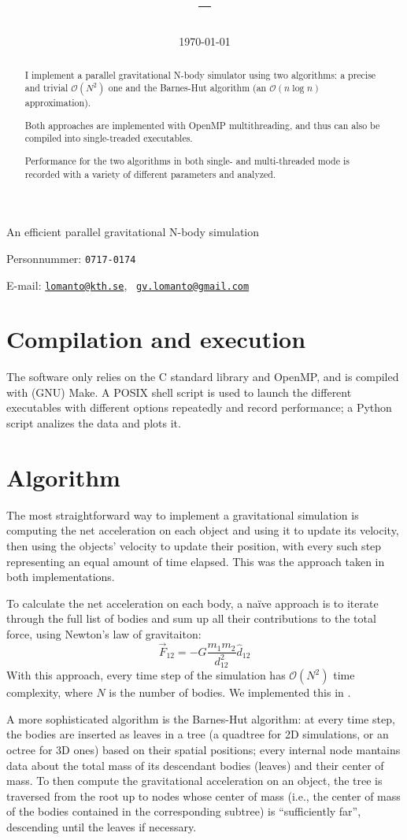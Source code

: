 \documentclass[a4paper, 11pt]{article}
\author{\fullname}
\title{\thiscourse{} \thisreport{} -- \thisprogram{} \thisperiod{}}
\date{\today}
\makeatletter
\newcommand\titlegeometry{\newgeometry{left = 5cm, right = 5cm, top = 5cm, bottom = 5cm}}
\newcommand*\bigo[1]{\(\mathcal{O}\left(#1\right)\)}
\newcommand\bh{Barnes-Hut}
\newcommand\theomp{OpenMP}
\newcommand\posix{POSIX}
\newcommand*\versor[1]{\hat{#1}}
\newcommand*\mailto[1]{\href{mailto:#1}{\nolinkurl{#1}}}
\newcommand*\kthmail{\mailto{lomanto@kth.se}}
\newcommand*\personalmail{\mailto{gv.lomanto@gmail.com}}
\newcommand*\ddob{17}
\newcommand*\mmob{07}
\newcommand*\yyob{1995}
\newcommand*\pnlast{0174}
\newcommand*\personnummer{\expandafter\@gobbletwo\yyob\mmob\ddob-\pnlast}
\newcommand*\isodob{\yyob--\mmob--\ddob}
\newcommand*\thedob{Date of birth: \isodob}
\newcommand*\thepn{Personnummer: \texttt{\personnummer{}}}
\newcommand*\themail{E-mail: \kthmail{}, \ \personalmail{} }
\newcommand*\thesubtitle{An efficient parallel gravitational N-body simulation}
\newcommand*\undefbg{\backgroundsetup{pages=some,contents={}}}
\newenvironment{logotitlepage}
    { %
        \titlegeometry
        \begin{titlepage}
        \thispagestyle{empty}
        \BgThispage
        \begin{spacing}{2}
    }
    { %
        \end{spacing}
        \end{titlepage}
    }
\newcommand*\makemytitle{ %
    \begin{logotitlepage}
        \begin{center}
            \makebox[\textwidth][c]{\huge \thetitle}
			\par
			{\LARGE \thesubtitle}
            \par
            \thedate
        \end{center}

        \vfill

        \textsc{\theauthor} \par
        \thepn \par
        \themail
    \end{logotitlepage}
    \restoregeometry
    \undefbg
}
\makeatother
\begin{document}
\makemytitle

\newpage

\begin{abstract}
	I implement a parallel gravitational N-body simulator using two algorithms:
	a precise and trivial \bigo{N^2} one and the \bh{} algorithm (an \bigo{n \log n} approximation).

	Both approaches are implemented with \theomp{} multithreading, and thus can also be compiled into
	single-treaded executables.

	Performance for the two algorithms in both single- and multi-threaded mode is recorded with a
	variety of different parameters and analyzed.
\end{abstract}

\section{Compilation and execution}

The software only relies on the C standard library and \theomp{}, and is compiled with (GNU) Make.
A \posix{} shell script is used to launch the different executables with different options repeatedly and record performance;
a Python script analizes the data and plots it.

\section{Algorithm}
The most straightforward way to implement a gravitational simulation is computing the net acceleration
on each object and using it to update its velocity, then using the objects' velocity to update their
position, with every such step representing an equal amount of time elapsed. This was the approach
taken in both implementations.

To calculate the net acceleration on each body, a na\"ive approach is to iterate through the full
list of bodies and sum up all their contributions to the total force, using Newton's law of
gravitaiton:
\[
	\vec{F}_{12} = -G \frac{m_1 m_2}{d_{12}^2} \versor{d}_{12}
\]
With this approach, every time step of the simulation has \bigo{N^2} time complexity,
where $N$ is the number of bodies. We implemented this in .

A more sophisticated algorithm is the \bh{} algorithm: at every time step, the bodies are inserted
as leaves in a tree (a quadtree for 2D simulations, or an octree for 3D ones) based on their spatial
positions; every internal node mantains data about the total mass of its descendant bodies (leaves)
and their center of mass. To then compute the gravitational acceleration on an object,
the tree is traversed from the root up to nodes whose center of mass
(i.e., the center of mass of the bodies contained in the corresponding subtree)
is ``sufficiently far'', descending until the leaves if necessary.
\end{document}

